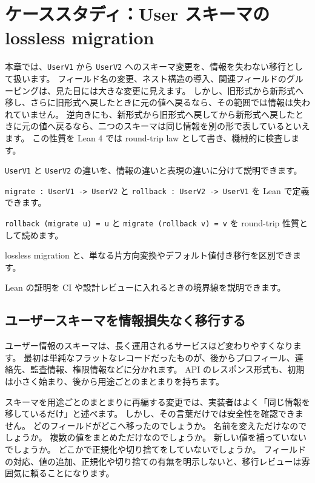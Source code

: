 \chapter{ケーススタディ：User スキーマの lossless migration}
\label{chap:ch28_user_schema_lossless_migration}

\begin{chapterabstract}
本章では、\texttt{UserV1} から \texttt{UserV2} へのスキーマ変更を、情報を失わない移行として扱います。
フィールド名の変更、ネスト構造の導入、関連フィールドのグルーピングは、見た目には大きな変更に見えます。
しかし、旧形式から新形式へ移し、さらに旧形式へ戻したときに元の値へ戻るなら、その範囲では情報は失われていません。
逆向きにも、新形式から旧形式へ戻してから新形式へ戻したときに元の値へ戻るなら、二つのスキーマは同じ情報を別の形で表しているといえます。
この性質を Lean 4 では round-trip law として書き、機械的に検査します。
\end{chapterabstract}

\begin{learninggoals}
\item \texttt{UserV1} と \texttt{UserV2} の違いを、情報の違いと表現の違いに分けて説明できます。
\item \texttt{migrate : UserV1 -> UserV2} と \texttt{rollback : UserV2 -> UserV1} を Lean で定義できます。
\item \texttt{rollback (migrate u) = u} と \texttt{migrate (rollback v) = v} を round-trip 性質として読めます。
\item lossless migration と、単なる片方向変換やデフォルト値付き移行を区別できます。
\item Lean の証明を CI や設計レビューに入れるときの境界線を説明できます。
\end{learninggoals}

\section{ユーザースキーマを情報損失なく移行する}

ユーザー情報のスキーマは、長く運用されるサービスほど変わりやすくなります。
最初は単純なフラットなレコードだったものが、後からプロフィール、連絡先、監査情報、権限情報などに分かれます。
API のレスポンス形式も、初期は小さく始まり、後から用途ごとのまとまりを持ちます。

スキーマを用途ごとのまとまりに再編する変更では、実装者はよく「同じ情報を移しているだけ」と述べます。
しかし、その言葉だけでは安全性を確認できません。
どのフィールドがどこへ移ったのでしょうか。
名前を変えただけなのでしょうか。
複数の値をまとめただけなのでしょうか。
新しい値を補っていないでしょうか。
どこかで正規化や切り捨てをしていないでしょうか。
フィールドの対応、値の追加、正規化や切り捨ての有無を明示しないと、移行レビューは雰囲気に頼ることになります。

